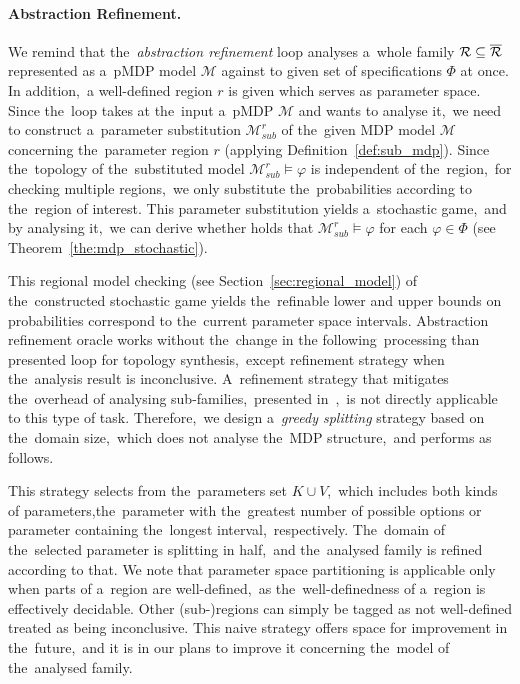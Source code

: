 \paragraph{Abstraction Refinement.}
We remind that the~\textit{abstraction refinement} loop analyses a~whole family $\mathcal{R} \subseteq \overline{\mathcal{R}}$ represented as a~pMDP model $\mathcal{M}$ against to given set of specifications $\varPhi$ at once.
In addition,~a well-defined region $r$ is given which serves as parameter space.
Since the~loop takes at the~input a~pMDP $\mathcal{M}$ and wants to analyse it,~we need to construct a~parameter substitution $\mathcal{M}_{sub}^r$ of the~given MDP model $\mathcal{M}$ concerning the~parameter region $r$ (applying Definition~\ref{def:sub_mdp}).
Since the~topology of the~substituted model $\mathcal{M}_{sub}^r \models \varphi$ is independent of the~region,~for checking multiple regions,~we only substitute the~probabilities according to the~region of interest.
This parameter substitution yields a~stochastic game,~and by analysing it,~we can derive whether holds that $\mathcal{M}_{sub}^r \models \varphi$ for each $\varphi \in \varPhi$ (see Theorem~\ref{the:mdp_stochastic}).

This regional model checking (see Section~\ref{sec:regional_model}) of the~constructed stochastic game yields the~refinable lower and upper bounds on probabilities correspond to the~current parameter space intervals.
Abstraction refinement oracle works without the~change in the following~processing than presented loop for topology synthesis,~except refinement strategy when the~analysis result is inconclusive.
A~refinement strategy that mitigates the~overhead of analysing sub-families,~presented in~\cite{cegar},~is not directly applicable to this type of task.
Therefore,~we design a~\textit{greedy splitting} strategy based on the~domain size,~which does not analyse the~MDP structure,~and performs as follows.


This strategy selects from the~parameters set $K \cup V$,~which includes both kinds of parameters,the~parameter with the~greatest number of possible options or parameter containing the~longest interval,~respectively.
The~domain of the~selected parameter is splitting in half,~and the~analysed family is refined according to that.
We note that parameter space partitioning is applicable only when parts of a~region are well-defined,~as the~well-definedness of a~region is effectively decidable. 
Other (sub-)regions can simply be tagged as not well-defined treated as being inconclusive.
This naive strategy offers space for improvement in the~future,~and it is in our plans to improve it concerning the~model of the~analysed family.

